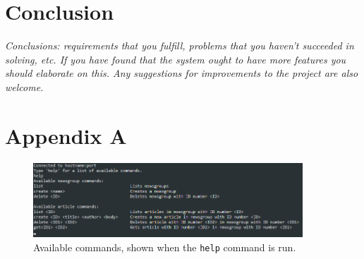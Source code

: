 \documentclass[a4paper]{article}
\begin{document}
\section{Conclusion}

\emph{Conclusions: requirements that you fulfill, problems that you haven’t succeeded in solving,
etc. If you have found that the system ought to have more features you should elaborate on
this. Any suggestions for improvements to the project are also welcome.}

\section*{Appendix A}


\begin{figure}[h]
    \centering
    \includegraphics[width=0.9\textwidth]{help_text_appendix.png}
    \caption{Available commands, shown when the \texttt{help} command is run.}
    \label{fig:help}
\end{figure}
\end{document}
